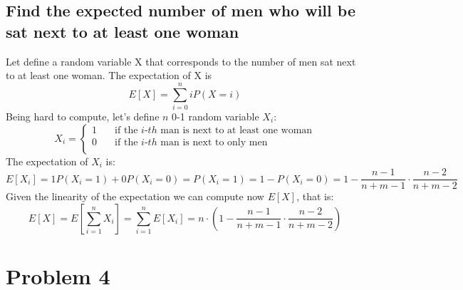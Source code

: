 \documentclass[oneside]{article}			%
\begin{document}
	\subsection{Find the expected number of men who will be sat next to at least one woman}
	Let define a random variable X that corresponds to the number of men sat next to at least one woman. The expectation of X is
	\[ E[X] =  \sum_{i=0}^{n}iP(X=i)\]
	Being hard to compute, let's define $n$ 0-1 random variable $X_i$:
	\[ X_i = \begin{cases}
		1 & \quad \text{if the } i \text{-$th$ man is next to at least one woman} \\
		0 & \quad \text{if the } i \text{-$th$ man is next to only men} \\
		 \end{cases}\]
	The expectation of $X_i$ is:
	\[ E[X_i] =  1P(X_i=1)+0P(X_i=0) = P(X_i=1) = 1-P(X_i=0) = 1 - \frac{n-1}{n+m-1}\cdot\frac{n-2}{n+m-2}\]
	Given the linearity of the expectation we can compute now $E[X]$, that is:
	\[ E[X] =  E[\sum_{i=1}^{n}X_i] = \sum_{i=1}^{n}E[X_i] = n\cdot(1 - \frac{n-1}{n+m-1}\cdot\frac{n-2}{n+m-2}) \]


	\clearpage				%
	\setcounter{section}{4}		%
	\setcounter{subsection}{0}		%
	\section*{Problem 4}
\end{document}
